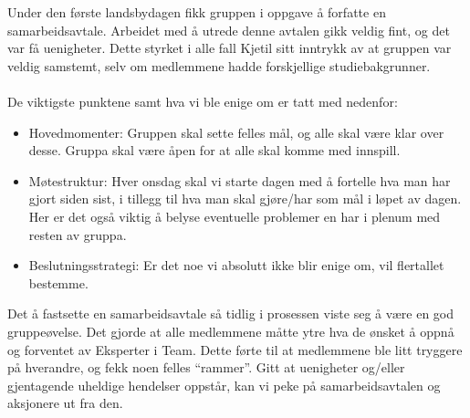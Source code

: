 Under den første landsbydagen fikk gruppen i oppgave å forfatte en
samarbeidsavtale. Arbeidet med å utrede denne avtalen gikk veldig fint,
og det var få uenigheter. Dette styrket i alle fall Kjetil sitt inntrykk
av at gruppen var veldig samstemt, selv om medlemmene hadde forskjellige
studiebakgrunner.\\
\\
 De viktigste punktene samt hva vi ble enige om er tatt
med nedenfor:
\begin{itemize}
	\item Hovedmomenter: Gruppen skal sette felles mål, og alle skal
	være klar over desse.  Gruppa skal være åpen for at alle skal komme med
	innspill.
	\item Møtestruktur: Hver onsdag skal vi starte dagen med å fortelle
	hva man har gjort siden sist, i tillegg til hva man skal gjøre/har som
	mål i løpet av dagen. Her er det også viktig å belyse eventuelle
	problemer en har i plenum med resten av gruppa.
	\item Beslutningsstrategi: Er det noe vi absolutt ikke blir enige
	om, vil flertallet bestemme.
\end{itemize}
Det å fastsette en samarbeidsavtale så tidlig i prosessen viste seg å
være en god gruppeøvelse. Det gjorde at alle medlemmene måtte ytre hva
de ønsket å oppnå og forventet av Eksperter i Team. Dette førte til at
medlemmene ble litt tryggere på hverandre, og fekk noen felles
``rammer''. Gitt at uenigheter og/eller gjentagende uheldige hendelser
oppstår, kan vi peke på samarbeidsavtalen og aksjonere ut fra den.
